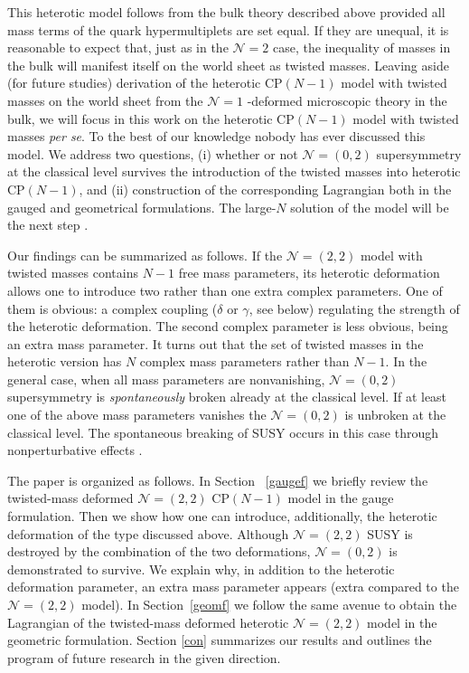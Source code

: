 \documentclass[12pt]{article}
\newcommand{\ntwo}{${\mathcal N}=2$ }
\newcommand{\ntwot}{${\mathcal N}= \left(2,2\right) $ }
\newcommand{\ntwoo}{${\mathcal N}= \left(0,2\right) $ }
\newcommand{\none}{${\mathcal N}=1$ }
\begin{document}
 This heterotic model follows from the bulk theory   described above provided all
 mass terms of the quark hypermultiplets are set equal. If they are unequal,
 it is reasonable to expect that, just as in the \ntwo case,
 the inequality of masses in the bulk will manifest itself  on the world sheet as
 twisted masses. Leaving aside (for future studies)
 derivation of the heterotic CP$(N-1)$ model with twisted masses on the world sheet
 from the \none-deformed microscopic theory in the bulk,
 we will focus in this work on the
  heterotic CP$(N-1)$ model with twisted masses {\em per se}. To the best of our knowledge
  nobody has ever discussed this model. 
  We address two questions, (i) whether or not \ntwoo supersymmetry at the classical level
  survives the introduction of the twisted masses into heterotic CP$(N-1)$,
  and (ii) construction of the corresponding Lagrangian both in the gauged and geometrical formulations.
  The large-$N$ solution of the model will be the next step \cite{BSY5}.
  
  Our findings can be summarized as follows. If the \ntwot model with twisted masses
  contains $N-1$ free mass parameters, its heterotic deformation allows one to introduce two rather than one 
  extra complex parameters. One of them is obvious: a complex coupling ($\delta$ or $\gamma$, see below)
 regulating the strength of the heterotic deformation. The second complex parameter is less obvious,
 being an extra mass parameter. It turns out that the set of twisted masses
 in the heterotic version has $N$ complex mass parameters rather than $N-1$.
 In the general case, when all mass parameters are nonvanishing, \ntwoo
 supersymmetry is {\em spontaneously} broken already at the classical level.
 If at least one of the above mass parameters vanishes the \ntwoo is unbroken at the classical level.
 The spontaneous breaking of SUSY occurs in this case through nonperturbative effects \cite{BSY5}.
 
 The paper is organized as follows. In Section ~\ref{gaugef} we briefly review
the twisted-mass deformed \ntwot CP$(N-1)$ model in the gauge formulation.
 Then we show how one can introduce, additionally, the heterotic deformation of the type discussed above.
 Although \ntwot SUSY is destroyed by the combination of the two deformations,
 \ntwoo is demonstrated to survive.
 We explain why, in addition to the heterotic deformation parameter, an extra mass parameter appears (extra
 compared to the \ntwot model). 
 \newpage
 In Section~\ref{geomf} we follow the same avenue to obtain 
 the Lagrangian of the  twisted-mass deformed heterotic  \ntwot model in the geometric formulation.
 Section \ref{con} summarizes our results and outlines the program of future research in the given direction.
\end{document}
